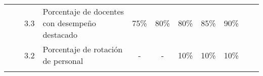 \documentclass[7pt,a4paper]{article}
\begin{document}
\begin{table}[]
\begin{tabular}{|llllccccccc|}
\rowcolor[HTML]{FFFFFF} 
\multicolumn{1}{|l|}{\cellcolor[HTML]{FFFFFF}}                                                     & \multicolumn{1}{l|}{\cellcolor[HTML]{FFFFFF}}                                                                                                                                                                                                       & \multicolumn{1}{l|}{\cellcolor[HTML]{FFFFFF}3.3}                                                  & \multicolumn{1}{l|}{\cellcolor[HTML]{FFFFFF}Porcentaje de docentes con desempeño destacado}                                                                                    & \multicolumn{1}{c|}{\cellcolor[HTML]{FFFFFF}75\%}                                 & \multicolumn{1}{c|}{\cellcolor[HTML]{FFFFFF}80\%}                                 & \multicolumn{1}{c|}{\cellcolor[HTML]{FFFFFF}80\%}                                 & \multicolumn{1}{c|}{\cellcolor[HTML]{FFFFFF}85\%}                                 & \multicolumn{1}{c|}{\cellcolor[HTML]{FFFFFF}90\%}                                 & \multicolumn{1}{c|}{\cellcolor[HTML]{FFFFFF}}                                     &                                                                                   \\ \cline{3-11} 
\rowcolor[HTML]{FFFFFF} 
\multicolumn{1}{|l|}{\cellcolor[HTML]{FFFFFF}}                                                     & \multicolumn{1}{l|}{\cellcolor[HTML]{FFFFFF}}                                                                                                                                                                                                       & \multicolumn{1}{l|}{\cellcolor[HTML]{FFFFFF}3.2}                                                  & \multicolumn{1}{l|}{\cellcolor[HTML]{FFFFFF}Porcentaje de rotación de personal}                                                                                                & \multicolumn{1}{c|}{\cellcolor[HTML]{FFFFFF}-}                                    & \multicolumn{1}{c|}{\cellcolor[HTML]{FFFFFF}-}                                    & \multicolumn{1}{c|}{\cellcolor[HTML]{FFFFFF}10\%}                                 & \multicolumn{1}{c|}{\cellcolor[HTML]{FFFFFF}10\%}                                 & \multicolumn{1}{c|}{\cellcolor[HTML]{FFFFFF}10\%}                                 & \multicolumn{1}{c|}{\cellcolor[HTML]{FFFFFF}}                                     &                                                                                   \\ \cline{3-11} 
\rowcolor[HTML]{FFFFFF} 

\end{tabular}
\end{table}
\end{document}
